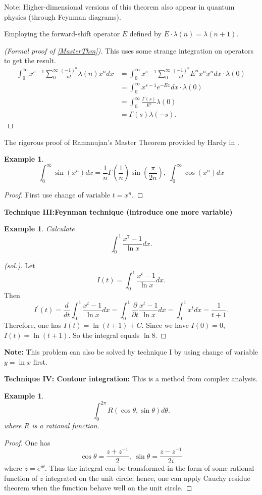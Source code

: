 \documentclass{book}
\newtheorem{eg}[defi]{Example}
\numberwithin{equation}{section}
\begin{document}
Note: Higher-dimensional versions of this theorem also appear in quantum physics (through Feynman diagrams).\medskip

Employing the forward-shift operator $E$ defined by
$E\cdot \lambda(n)=\lambda(n+1).$

\begin{proof}[(Formal proof of \ref{MasterThm})]
This uses some strange integration on operators to get the result.
    \[
        \begin{aligned}
            \int_0^\infty x^{s-1}\sum_0^\infty \frac{(-1)^n}{n!}\lambda(n) x^ndx&=\int_0^\infty x^{s-1}\sum_0^\infty \frac{(-1)^n}{n!}E^nx^n x^ndx\cdot \lambda(0) \\
            &=\int_0^\infty x^{s-1}e^{-Ex}dx\cdot \lambda(0) \\ 
            &=\int_0^\infty \frac{\Gamma(s)}{E^s}\lambda(0)\\
            &=\Gamma(s)\lambda(-s).
        \end{aligned}
    \]
\end{proof}

The rigorous proof of Ramanujan’s Master Theorem provided by Hardy in \cite{H}.
\begin{eg}
    $$
    \int_0^\infty \sin(x^n) dx=\frac{1}{n}\Gamma(\frac{1}{n})\sin(\frac{\pi}{2n}), \; \int_0^\infty \cos(x^n) dx
    $$
\end{eg}
\begin{proof}
    First use change of variable $t=x^n.$
\end{proof}

\textbf{Technique III:Feynman technique (introduce one more variable)}
\begin{eg}
    Calculate
    \[
\int_0^1\frac{x^7-1}{\ln x} dx.
    \]
\end{eg}    
\begin{proof}[(sol.)]
    Let 
    \[
    I(t)=\int_0^1\frac{x^t-1}{\ln x}dx.
    \] Then
    \[
    I^\prime(t)=\frac{d}{dt}\int_0^1\frac{x^t-1}{\ln x}dx=\int_0^1\frac{\partial}{\partial t}\frac{x^t-1}{\ln x}dx=\int_0^1 x^t dx=\frac{1}{t+1}.
    \] Therefore, one has $I(t)=\ln(t+1)+C.$ Since we have $I(0)=0,$ $I(t)=\ln(t+1)$. So the integral equals $\ln 8.$ 
\end{proof}

\textbf{Note:} This problem can also be solved by technique I by using change of variable $y=\ln x$ first. 

\textbf{Technique IV: Contour integration:}
This is a method from complex analysis.
\begin{eg}
\[
\int_0^{2\pi} R(\cos\theta,\sin\theta) d\theta.
\] where $R$ is a rational function.
\end{eg}
\begin{proof}
    One has
    \[
    \cos\theta=\frac{z+z^{-1}}{2}, \; \sin\theta=\frac{z-z^{-1}}{2i}
    \] where $z=e^{i\theta}.$ Thus the integral can be transformed in the form of some rational function of $z$ integrated on the unit circle; hence, one can apply Cauchy residue theorem when the function behave well on the unit circle.
\end{proof}
\end{document}
